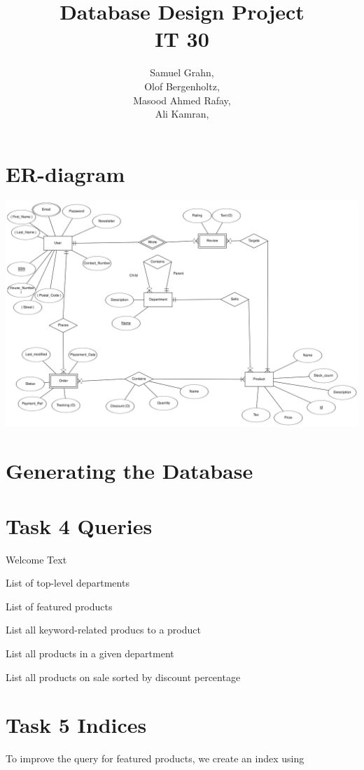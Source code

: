 \documentclass{article}
\title{
  Database Design Project\\
  IT 30
}
\author{
  Samuel Grahn, \email{samuel.grahn@outlook.com}\\
  Olof Bergenholtz, \email{obergenholtz@gmail.com}\\
  Masood Ahmed Rafay, \email{Rafayqureshi2010@gmail.com}\\
  Ali Kamran, \email{alkmrn1@gmail.com}\\
}
\newcommand{\sql}[1]{}
\begin{document}
\maketitle
\newpage
\section*{ER-diagram}
\includegraphics[height=\linewidth,angle=90]{er.png}

\section*{Generating the Database}
\sql{table_generation}

\section*{Task 4 Queries}
Welcome Text
\sql{welcome}
List of top-level departments
\sql{topleveldpt}
List of featured products
\sql{featured_products}
List all keyword-related producs to a product
\sql{similar_products}
List all products in a given department
\sql{dept_products}
List all products on sale sorted by discount percentage
\sql{sale}

\section*{Task 5 Indices}
To improve the query for featured products, we create an index using\\
\sql{indices}
\end{document}
